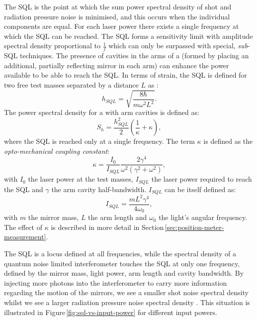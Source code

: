 The \gls{SQL} is the point at which the sum power spectral density of shot and radiation pressure noise is minimised, and this occurs when the individual components are equal. For each laser power there exists a single frequency at which the \gls{SQL} can be reached. The \gls{SQL} forms a sensitivity limit with amplitude spectral density proportional to $\frac{1}{f}$ which can only be surpassed with special, \emph{sub}-\gls{SQL} techniques. The presence of cavities in the arms of a \MI{} (formed by placing an additional, partially reflecting mirror in each arm) can enhance the power available to be able to reach the \gls{SQL}. In terms of strain, the \gls{SQL} is defined for two free test masses separated by a distance $L$ as \cite{Braginsky1996}:
\begin{equation}
  \label{eq:strainsql}
  h_{SQL} = \sqrt{\frac{8 \hbar}{m \omega^2 L^2}}.
\end{equation}
The power spectral density for a \MI{} with arm cavities is defined as:
\begin{equation}
  \label{eq:classicalifospectrum}
  S_h = \frac{h^{2}_{SQL}}{2} \left( \frac{1}{\kappa} + \kappa \right),
\end{equation}
where the \gls{SQL} is reached only at a single frequency. The term $\kappa$ is defined as the \emph{opto-mechanical coupling constant}:
\begin{equation}
 \kappa = \frac{I_0}{I_{SQL}} \frac{2 \gamma^4}{\omega^2 \left( \gamma^2 +
\omega^2 \right)},
 \label{eq:optomechanicalcoupling}
\end{equation}
with $I_0$ the laser power at the test masses, $I_{SQL}$ the laser power required to reach the \gls{SQL} and $\gamma$ the arm cavity half-bandwidth. $I_{SQL}$ can be itself defined as:
\begin{equation}
 I_{SQL} = \frac{m L^2 \gamma^4}{4 \omega_0},
\end{equation}
with $m$ the mirror mass, $L$ the arm length and $\omega_0$ the light's angular frequency. The effect of $\kappa$ is described in more detail in Section\,\ref{sec:position-meter-measurement}.

The \gls{SQL} is a locus defined at all frequencies, while the spectral density of a quantum noise limited interferometer touches the \gls{SQL} at only one frequency, defined by the mirror mass, light power, arm length and cavity bandwidth. By injecting more photons into the interferometer to carry more information regarding the motion of the mirrors, we see a smaller shot noise spectral density whilst we see a larger radiation pressure noise spectral density \cite{Caves1981}. This situation is illustrated in Figure\,\ref{fig:sql-vs-input-power} for different input powers.

